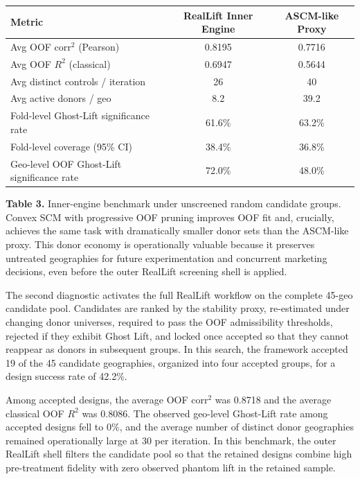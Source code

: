 \documentclass[11pt]{article}
\begin{document}
\begin{center}
\small
\begin{tabular}{lcc}
\hline
Metric & RealLift Inner Engine & ASCM-like Proxy \\
\hline
Avg OOF corr$^2$ (Pearson) & 0.8195 & 0.7716 \\
Avg OOF $R^2$ (classical) & 0.6947 & 0.5644 \\
Avg distinct controls / iteration & 26 & 40 \\
Avg active donors / geo & 8.2 & 39.2 \\
Fold-level Ghost-Lift significance rate & 61.6\% & 63.2\% \\
Fold-level coverage (95\% CI) & 38.4\% & 36.8\% \\
Geo-level OOF Ghost-Lift significance rate & 72.0\% & 48.0\% \\
\hline
\end{tabular}
\end{center}

\noindent\textbf{Table 3.} Inner-engine benchmark under unscreened random candidate groups. Convex SCM with progressive OOF pruning improves OOF fit and, crucially, achieves the same task with dramatically smaller donor sets than the ASCM-like proxy. This donor economy is operationally valuable because it preserves untreated geographies for future experimentation and concurrent marketing decisions, even before the outer RealLift screening shell is applied.

The second diagnostic activates the full RealLift workflow on the complete 45-geo candidate pool. Candidates are ranked by the stability proxy, re-estimated under changing donor universes, required to pass the OOF admissibility thresholds, rejected if they exhibit Ghost Lift, and locked once accepted so that they cannot reappear as donors in subsequent groups. In this search, the framework accepted 19 of the 45 candidate geographies, organized into four accepted groups, for a design success rate of 42.2\%.

Among accepted designs, the average OOF corr$^2$ was 0.8718 and the average classical OOF $R^2$ was 0.8086. The observed geo-level Ghost-Lift rate among accepted designs fell to 0\%, and the average number of distinct donor geographies remained operationally large at 30 per iteration. In this benchmark, the outer RealLift shell filters the candidate pool so that the retained designs combine high pre-treatment fidelity with zero observed phantom lift in the retained sample.
\end{document}

